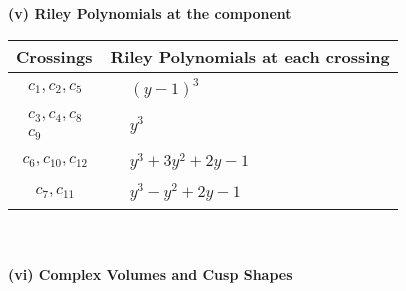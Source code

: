 \documentclass[1p]{elsarticle_modified}
\theoremstyle{definition}
\begin{document}
\newpage\renewcommand{\arraystretch}{1}
\flushleft \textbf{(v) Riley Polynomials at the component}\newline \\
\begin{tabular}{m{50pt}|m{274pt}}
Crossings & \hspace{64pt}Riley Polynomials at each crossing \\
\hline $$\begin{aligned}c_{1},c_{2},c_{5}\end{aligned}$$&$\begin{aligned}
&(y-1)^3
\end{aligned}$\\
\hline $$\begin{aligned}c_{3},c_{4},c_{8}\\c_{9}\end{aligned}$$&$\begin{aligned}
&y^3
\end{aligned}$\\
\hline $$\begin{aligned}c_{6},c_{10},c_{12}\end{aligned}$$&$\begin{aligned}
&y^3+3 y^2+2 y-1
\end{aligned}$\\
\hline $$\begin{aligned}c_{7},c_{11}\end{aligned}$$&$\begin{aligned}
&y^3- y^2+2 y-1
\end{aligned}$\\
\hline
\end{tabular}\\~\\
\newpage\flushleft \textbf{(vi) Complex Volumes and Cusp Shapes}
\end{document}
